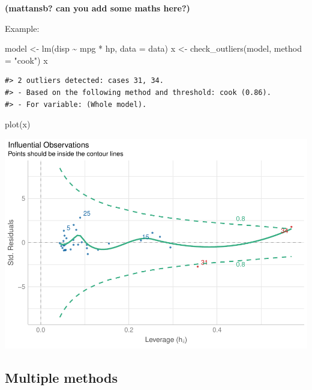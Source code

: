 \documentclass[
]{article}
\newenvironment{Shaded}{\begin{snugshade}}{\end{snugshade}}
\newcommand{\AttributeTok}[1]{\textcolor[rgb]{0.77,0.63,0.00}{#1}}
\newcommand{\FunctionTok}[1]{\textcolor[rgb]{0.00,0.00,0.00}{#1}}
\newcommand{\NormalTok}[1]{#1}
\newcommand{\OtherTok}[1]{\textcolor[rgb]{0.56,0.35,0.01}{#1}}
\newcommand{\SpecialCharTok}[1]{\textcolor[rgb]{0.00,0.00,0.00}{#1}}
\newcommand{\StringTok}[1]{\textcolor[rgb]{0.31,0.60,0.02}{#1}}
\begin{document}
\textbf{(\textbf{mattansb?} can you add some maths here?)}

Example:

\begin{Shaded}
\begin{Highlighting}[]
\NormalTok{model }\OtherTok{\textless{}{-}} \FunctionTok{lm}\NormalTok{(disp }\SpecialCharTok{\textasciitilde{}}\NormalTok{ mpg }\SpecialCharTok{*}\NormalTok{ hp, }\AttributeTok{data =}\NormalTok{ data)}
\NormalTok{x }\OtherTok{\textless{}{-}} \FunctionTok{check\_outliers}\NormalTok{(model, }\AttributeTok{method =} \StringTok{"cook"}\NormalTok{)}
\NormalTok{x}
\end{Highlighting}
\end{Shaded}

\begin{verbatim}
#> 2 outliers detected: cases 31, 34.
#> - Based on the following method and threshold: cook (0.86).
#> - For variable: (Whole model).
\end{verbatim}

\begin{Shaded}
\begin{Highlighting}[]
\FunctionTok{plot}\NormalTok{(x)}
\end{Highlighting}
\end{Shaded}

\includegraphics[width=1\linewidth]{paper_files/figure-latex/model-based outliers-1}

\hypertarget{multiple-methods}{%
\subsection{Multiple methods}\label{multiple-methods}}
\end{document}
